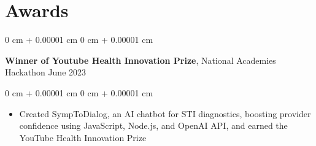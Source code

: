 \documentclass[10pt, letterpaper]{article}
\newenvironment{highlights}{
    \begin{itemize}[
        topsep=0.10 cm,
        parsep=0.10 cm,
        partopsep=0pt,
        itemsep=0pt,
        leftmargin=0 cm + 10pt
    ]
}{
    \end{itemize}
} %
\newenvironment{onecolentry}{
    \begin{adjustwidth}{
        0 cm + 0.00001 cm
    }{
        0 cm + 0.00001 cm
    }
}{
    \end{adjustwidth}
} %
\newenvironment{twocolentry}[2][]{
    \onecolentry
    \def\secondColumn{#2}
    \setcolumnwidth{\fill, 4.5 cm}
    \begin{paracol}{2}
}{
    \switchcolumn \raggedleft \secondColumn
    \end{paracol}
    \endonecolentry
} %
\begin{document}
    
    \section{Awards}



        
        \begin{twocolentry}{
            June 2023
        }
            \textbf{Winner of Youtube Health Innovation Prize}, National Academies Hackathon\end{twocolentry}

        \vspace{0.10 cm}
        \begin{onecolentry}
            \begin{highlights}
                \item Created SympToDialog, an AI chatbot for STI diagnostics, boosting provider confidence using JavaScript, Node.js, and OpenAI API, and earned the YouTube Health Innovation Prize
            \end{highlights}
        \end{onecolentry}



    
\end{document}
